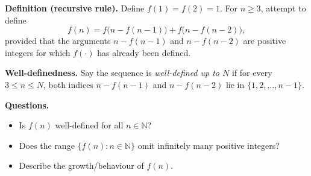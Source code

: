 \textbf{Definition (recursive rule).} Define $f(1)=f(2)=1$. For $n\ge 3$, attempt to define
\[
 f(n) = f\big(n-f(n-1)\big)+f\big(n-f(n-2)\big),
\]
provided that the arguments $n-f(n-1)$ and $n-f(n-2)$ are positive integers for which $f(\cdot)$ has already been defined.

\textbf{Well-definedness.} Say the sequence is \emph{well-defined up to $N$} if for every $3\le n\le N$, both indices $n-f(n-1)$ and $n-f(n-2)$ lie in $\{1,2,\dots,n-1\}$.

\textbf{Questions.}
\begin{itemize}
\item[(Q1)] Is $f(n)$ well-defined for all $n\in\mathbb{N}$?
\item[(Q2)] Does the range $\{f(n): n\in\mathbb{N}\}$ omit infinitely many positive integers?
\item[(Q3)] Describe the growth/behaviour of $f(n)$.
\end{itemize}

